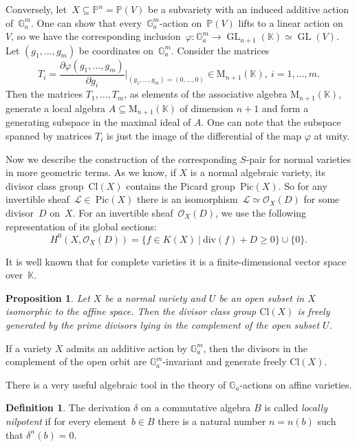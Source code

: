 \documentclass[a4paper,draft,reqno,12pt]{amsart}
\newtheorem{proposition}{Proposition}
\theoremstyle{definition}
\newtheorem{definition}{Definition}
\theoremstyle{definition}
\theoremstyle{remark}
\DeclareMathOperator{\Pic}{Pic}
\DeclareMathOperator{\GL}{GL}
\def\BG{{\mathbb G}}
\def\BK{{\mathbb K}}
\def\BG{{\mathbb G}}
\def\BK{{\mathbb K}}
\def\BP{{\mathbb P}}
\def\CO{\mathcal{O}}
\def\CL{\mathcal{L}}
\def\Cl{\mathrm{Cl}}
\def\Pic{\mathrm{Pic}}
\def\div{\mathrm{div}}
\begin{document}
Conversely, let~$X \subseteq \BP^n=\BP(V)$ be a subvariety with an induced additive action of~$\BG_a^m$. One can show that every~$\BG_a^m$-action on~$\BP(V)$ lifts to a linear action on~$V$, so we have the corresponding inclusion~$\varphi:\BG_a^m \to\GL_{n+1}(\BK) \simeq \GL(V)$. Let $(g_1, \dotsc, g_m)$ be coordinates on~$\BG_a^m$. Consider the matrices\begin{equation*}
    T_i = \frac{\partial \varphi(g_1,\dotsc,g_m)}{\partial g_i}\Bigg|_{(g_1,\dotsc,g_m)=(0,\dotsc,0)} \in \text{M}_{n+1}(\BK), \ i = 1,\dotsc, m.
\end{equation*} Then the matrices $T_1, \dotsc, T_m$, as elements of the associative algebra $\text{M}_{n+1}(\BK)$, generate a local algebra $A\subseteq \text{M}_{n+1}(\BK)$ of dimension $n+1$ and form a generating subspace in the maximal ideal of $A$. One can note that the subspace spanned by matrices $T_i$ is just the image of the differential of the map $\varphi$ at unity.

Now we describe the construction of the corresponding $S$-pair for normal varieties in more geometric terms. As we know, if $X$ is a normal algebraic variety, its divisor class group~$\Cl(X)$ contains the Picard group~$\Pic(X)$. So for any invertible sheaf~$\CL\in~\Pic(X)$ there is an isomorphism~$\CL\simeq\CO_X(D)$ for some divisor~$D$ on~$X$. For an invertible sheaf~$\CO_X(D)$, we use the following representation of its global sections: \begin{equation}
    H^0(X, \CO_X(D)) = \{f\in K(X) \ \big| \ \div(f) + D \geq 0\} \cup \{0\}.
\end{equation}

It is well known that for complete varieties it is a finite-dimensional vector space over~$\BK$.

\begin{proposition}\cite[Proposition 3.1]{AZ}\label{picaff}
    Let $X$ be a normal variety and $U$ be an open subset in $X$ isomorphic to the affine space. Then the divisor class group $\Cl(X)$ is freely generated by the prime divisors lying in the complement of the open subset $U$.
\end{proposition}

If a variety $X$ admits an additive action by $\BG_a^m$, then the divisors in the complement of the open orbit are $\BG_a^m$-invariant and generate freely $\Cl(X)$.


There is a very useful algebraic tool in the theory of $\BG_a$-actions on affine varieties.

\begin{definition}
     The derivation $\delta$ on a commutative algebra $B$ is called \emph{locally nilpotent} if for every element~$b\in B$ there is a natural number $n = n(b)$ such that $\delta^n(b) = 0$.
\end{definition}
\end{document}
